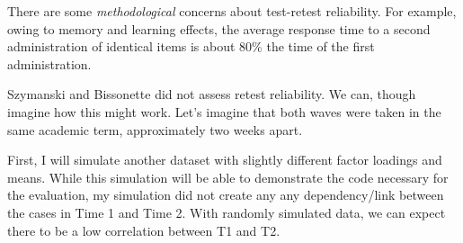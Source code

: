 \documentclass[
  english,
]{book}
\begin{document}
There are some \emph{methodological} concerns about test-retest reliability. For example, owing to memory and learning effects, the average response time to a second administration of identical items is about 80\% the time of the first administration.

Szymanski and Bissonette \citeyearpar{szymanski_perceptions_2020} did not assess retest reliability. We can, though imagine how this might work. Let's imagine that both waves were taken in the same academic term, approximately two weeks apart.

First, I will simulate another dataset with slightly different factor loadings and means. While this simulation will be able to demonstrate the code necessary for the evaluation, my simulation did not create any any dependency/link between the cases in Time 1 and Time 2. With randomly simulated data, we can expect there to be a low correlation between T1 and T2.
\end{document}
